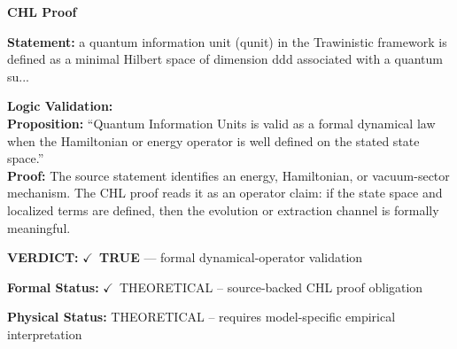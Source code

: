 \vspace{0.45em}
\noindent\textbf{CHL Proof}\par
\textbf{Statement:} a quantum information unit (qunit) in the Trawinistic framework is defined as a minimal
Hilbert space of dimension ddd associated with a quantum su...

\textbf{Logic Validation:}\\
\textbf{Proposition:} ``Quantum Information Units is valid as a formal dynamical law when the Hamiltonian or
energy operator is well defined on the stated state space.''\\
\textbf{Proof:} The source statement identifies an energy, Hamiltonian, or vacuum-sector mechanism. The
CHL proof reads it as an operator claim: if the state space and localized terms are
defined, then the evolution or extraction channel is formally meaningful.

\textbf{VERDICT:} \ensuremath{\checkmark}\ \textbf{TRUE} --- formal dynamical-operator validation

\textbf{Formal Status:} \ensuremath{\checkmark}\ THEORETICAL -- source-backed CHL proof obligation

\textbf{Physical Status:} THEORETICAL -- requires model-specific empirical interpretation
\par\vspace{0.45em}
\par
\ifTZPDarkEdition
{}
\fi
\endgroup
\endgroup
